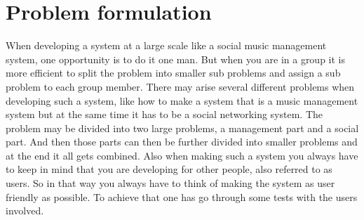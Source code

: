 \section{Problem formulation}
When developing a system at a large scale like a social music management system, one opportunity is to do it one man. But when you are in a group it is more efficient to split the problem into smaller sub problems and assign a sub problem to each group member. There may arise several different problems when developing such a system, like how to make a system that is a music management system but at the same time it has to be a social networking system. The problem may be divided into two large problems, a management part and a social part. And then those parts can then be further divided into smaller problems and at the end it all gets combined. Also when making such a system you always have to keep in mind that you are developing for other people, also referred to as users. So in that way you always have to think of making the system as user friendly as possible. To achieve that one has go through some tests with the users involved. 